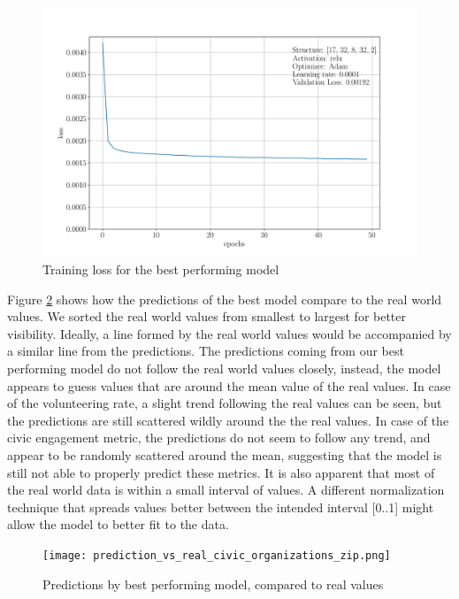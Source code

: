 \begin{figure}[H]
    \centering
    \includegraphics[width=1\linewidth]{training_evolution_best_model.png}  
    \caption{Training loss for the best performing model}
    \label{fig:best_model}
\end{figure}




Figure \ref{fig:real_vs_pred} shows how the predictions of the best model compare to the real world values. We sorted the real world values from smallest to largest for better visibility. Ideally, a line formed by the real world values would be accompanied by a similar line from the predictions. The predictions coming from our best performing model do not follow the real world values closely, instead, the model appears to guess values that are around the mean value of the real values. In case of the volunteering rate, a slight trend following the real values can be seen, but the predictions are still scattered wildly around the the real values. In case of the civic engagement metric, the predictions do not seem to follow any trend, and appear to be randomly scattered around the mean, suggesting that the model is still not able to properly predict these metrics.
It is also apparent that most of the real world data is within a small interval of values. A different normalization technique that spreads values better between the intended interval [0..1] might allow the model to better fit to the data.

\begin{figure}[H]
    \centering
    \texttt{[image: prediction\_vs\_real\_civic\_organizations\_zip.png]}  
    \caption{Predictions by best performing model, compared to real values}
    \label{fig:real_vs_pred}
\end{figure}